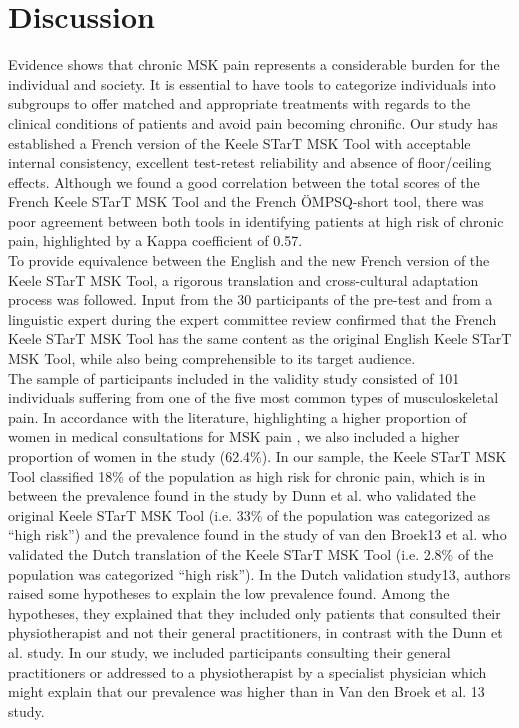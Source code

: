 \section{Discussion}
Evidence shows that chronic MSK pain represents a considerable burden for the individual and society. It is essential to have tools to categorize individuals into subgroups to offer matched and appropriate treatments with regards to the clinical conditions of patients and avoid pain becoming chronific. Our study has established a French version of the Keele STarT MSK Tool with acceptable internal consistency, excellent test-retest reliability and absence of floor/ceiling effects. Although we found a good correlation between the total scores of the French Keele STarT MSK Tool and the French ÖMPSQ-short tool, there was poor agreement between both tools in identifying patients at high risk of chronic pain, highlighted by a Kappa coefficient of 0.57.\\
To provide equivalence between the English and the new French version of the Keele STarT MSK Tool, a rigorous translation and cross-cultural adaptation process was followed. Input from the 30 participants of the pre-test and from a linguistic expert during the expert committee review confirmed that the French Keele STarT MSK Tool has the same content as the original English Keele STarT MSK Tool, while also being comprehensible to its target audience.\\ 
The sample of participants included in the validity study consisted of 101 individuals suffering from one of the five most common types of musculoskeletal pain. In accordance with the literature, highlighting a higher proportion of women in medical consultations for MSK pain \citep{vos2016global}, we also included a higher proportion of women in the study (62.4\%). In our sample, the Keele STarT MSK Tool classified 18\% of the population as high risk for chronic pain, which is in between the prevalence found in the study by Dunn et al. \citep{dunn2021refinement} who validated the original Keele STarT MSK Tool (i.e. 33\% of the population was categorized as “high risk”) and the prevalence found in the study of van den Broek13 et al.  who validated the Dutch translation of the Keele STarT MSK Tool (i.e. 2.8\% of the population was categorized “high risk”). In the Dutch validation study13, authors raised some hypotheses to explain the low prevalence found. Among the hypotheses, they explained that they included only patients that consulted their physiotherapist and not their general practitioners, in contrast with the Dunn et al. \citep{dunn2021refinement} study. In our study, we included participants consulting their general practitioners or addressed to a physiotherapist by a specialist physician which might explain that our prevalence was higher than in Van den Broek et al. 13 study. \\
